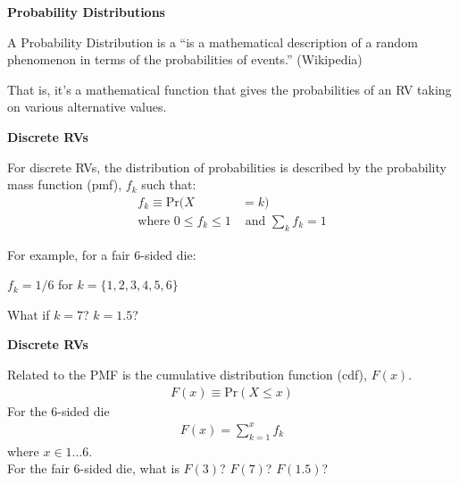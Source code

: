 \documentclass[12pt,xcolor=svgnames]{beamer}
\newcommand{\bl}{\color{blue}}
\newcommand{\theme}{\color{FireBrick}}
\newcommand{\sk}{\vspace{.4cm}}
\newcommand{\nsk}{\vspace{-.4cm}}
\newcommand{\chap}[1]{{\theme \Large \bf #1} \sk}
\newcommand{\pr}{\text{Pr}}
\begin{document}
\begin{frame}
\chap{Probability Distributions}

A {\bl Probability Distribution} is a ``is a mathematical description of a random phenomenon in terms of the probabilities of events.'' (Wikipedia)

\sk
That is, it's a mathematical function that gives the probabilities of an RV taking on various alternative values. 

\end{frame}



\begin{frame}
\chap{Discrete RVs}

For discrete RVs, the distribution of probabilities is described by the {\bl probability mass function} (pmf), $f_k$ such that:
\begin{align*}
f_k  \equiv \pr(X & = k) \\
\text{where } 0\leq f_k \leq 1 & \text{ and } \sum_k f_k = 1
\end{align*}
\nsk

For example, for a fair 6-sided die:

$f_k = 1/6$ for $k= \{1,2,3,4,5,6\}$

\sk
What if $k=7$? $k=1.5$?

\end{frame}

\begin{frame}
\chap{Discrete RVs}

Related to the PMF is the {\bl cumulative distribution function} (cdf), $F(x)$. 
\begin{align*}
F(x) \equiv \pr(X \leq x)
\end{align*}
For the 6-sided die
\nsk
\begin{align*}
F(x)= \sum_{k=1}^x f_k
\end{align*}
where $x \in 1\dots 6$.  \\
\sk
For the fair 6-sided die, what is $F(3)$?  $F(7)$? $F(1.5)$?

\end{frame}
\end{document}
